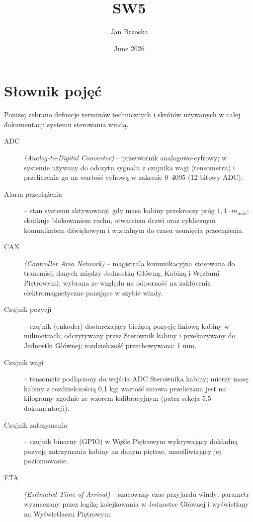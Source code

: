 \documentclass{article}
\title{SW5}
\author{Jan Brzoska}
\date{June 2026}
\begin{document}
\maketitle

\section{Słownik pojęć}

Poniżej zebrano definicje terminów technicznych i skrótów używanych w całej dokumentacji systemu sterowania windą.

\begin{description}

  \item[ADC] \textit{(Analog-to-Digital Converter)} – przetwornik analogowo-cyfrowy; w systemie używany do odczytu sygnału z czujnika wagi (tensometru) i przeliczenia go na wartość cyfrową w zakresie 0–4095 (12-bitowy ADC).

  \item[Alarm przeciążenia] – stan systemu aktywowany, gdy masa kabiny przekroczy próg $1{,}1 \cdot m_\text{max}$; skutkuje blokowaniem ruchu, otwarciem drzwi oraz cyklicznym komunikatem dźwiękowym i wizualnym do czasu usunięcia przeciążenia.

  \item[CAN] \textit{(Controller Area Network)} – magistrala komunikacyjna stosowana do transmisji danych między Jednostką Główną, Kabiną i Węzłami Piętrowymi; wybrana ze względu na odporność na zakłócenia elektromagnetyczne panujące w szybie windy.

  \item[Czujnik pozycji] – czujnik (enkoder) dostarczający bieżącą pozycję liniową kabiny w milimetrach; odczytywany przez Sterownik kabiny i przekazywany do Jednostki Głównej; rozdzielczość przechowywana: 1 mm.

  \item[Czujnik wagi] – tensometr podłączony do wejścia ADC Sterownika kabiny; mierzy masę kabiny z rozdzielczością 0,1 kg; wartość surowa przeliczana jest na kilogramy zgodnie ze wzorem kalibracyjnym (patrz sekcja 5.5 dokumentacji).

  \item[Czujnik zatrzymania] – czujnik binarny (GPIO) w Węźle Piętrowym wykrywający dokładną pozycję zatrzymania kabiny na danym piętrze, umożliwiający jej poziomowanie.

  \item[ETA] \textit{(Estimated Time of Arrival)} – szacowany czas przyjazdu windy; parametr wyznaczany przez logikę kolejkowania w Jednostce Głównej i wyświetlany na Wyświetlaczu Piętrowym.


\end{description}
\end{document}
